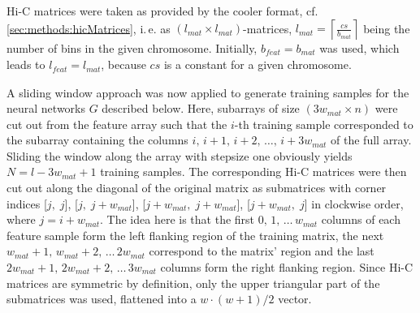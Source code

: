 Hi-C matrices were taken as provided by the cooler format, cf. \cref{sec:methods:hicMatrices}, 
i.\,e. as $(l_\mathit{mat} \times l_\mathit{mat})$-matrices, $l_\mathit{mat}=\left \lceil{\frac{cs}{b_\mathit{mat}}}\right \rceil$ being the number of bins in the given chromosome. 
Initially, $b_\mathit{feat} = b_\mathit{mat}$ was used, which leads to $l_\mathit{feat} = l_\mathit{mat}$, because $cs$ is a constant for a given chromosome.

A sliding window approach was now applied to generate training samples for the neural networks $G$ described below.
Here, subarrays of size $(3w_\mathit{mat} \times n)$ were cut out from the feature array 
such that the $i$-th training sample corresponded to the subarray containing the columns $i,\,i+1,\,i+2,\,\dots,\,i+3w_\mathit{mat}$ of the full array. 
Sliding the window along the array with stepsize one obviously yields $N=l-3w_\mathit{mat}+1$ training samples.
The corresponding Hi-C matrices were then cut out along the diagonal of the original matrix 
as submatrices with corner indices [$j,\;j$], [$j,\;j+w_\mathit{mat}$], [$j+w_\mathit{mat},\;j+w_\mathit{mat}$], [$j+w_\mathit{mat},\;j$] in clockwise order, where $j=i+w_\mathit{mat}$.
The idea here is that the first $0,\,1,\,\dots \,w_\mathit{mat}$ columns of each feature sample form the left flanking region of the training matrix, 
the next $w_\mathit{mat}+1,\,w_\mathit{mat}+2,\,\dots \,2w_\mathit{mat}$ correspond to the matrix' region and the last $2w_\mathit{mat}+1,\,2w_\mathit{mat}+2,\,\dots \,3w_\mathit{mat}$ columns form the right flanking region.
Since Hi-C matrices are symmetric by definition, only the upper triangular part of the submatrices was used, 
flattened into a $w\cdot (w+1)/2$ vector.

